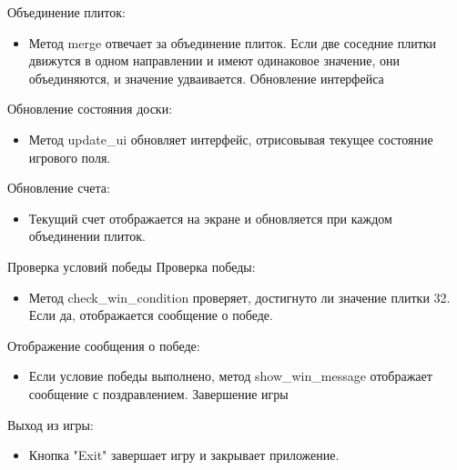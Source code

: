 Объединение плиток:
\begin{itemize}
\item Метод merge отвечает за объединение плиток. Если две соседние плитки движутся в одном направлении и имеют одинаковое значение, они объединяются, и значение удваивается.
Обновление интерфейса
\end{itemize}
Обновление состояния доски:
\begin{itemize}
\item Метод update\_ui обновляет интерфейс, отрисовывая текущее состояние игрового поля.
\end{itemize}
Обновление счета:
\begin{itemize}
\item Текущий счет отображается на экране и обновляется при каждом объединении плиток.
\end{itemize}
Проверка условий победы
Проверка победы:
\begin{itemize}
\item Метод check\_win\_condition проверяет, достигнуто ли значение плитки 32. Если да, отображается сообщение о победе.
\end{itemize}
Отображение сообщения о победе:
\begin{itemize}
\item Если условие победы выполнено, метод show\_win\_message отображает сообщение с поздравлением.
Завершение игры
\end{itemize}
Выход из игры:
\begin{itemize}
\item Кнопка "Exit" завершает игру и закрывает приложение.
\end{itemize}

